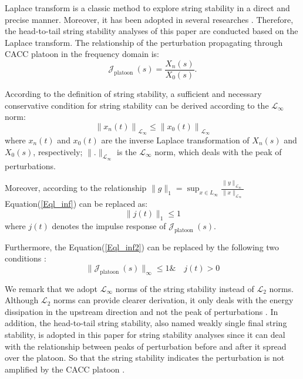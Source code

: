 \documentclass[journal]{IEEEtran}
\begin{document}
Laplace transform is a classic method to explore string stability in a direct and precise manner. Moreover, it has been adopted in several researches \citep{orosz2011delayed,montanino2021string,feng2019string}. Therefore, the head-to-tail string stability analyses of this paper are conducted based on the Laplace transform. The relationship of the perturbation propagating through CACC platoon in the frequency domain is:
\begin{equation}
  \mathcal{J}_{\text {platoon }}(s)=\frac{X_{n}(s)}{X_{0}(s)}.
\end{equation}

According to the definition of string stability, a sufficient and necessary conservative condition for string stability can be derived according to the $\mathcal{L}_{\infty}$ norm:
\begin{equation}
  \left\|x_{n}(t)\right\|_{\mathcal{L}_{\infty}} \leq \left\|x_{0}(t)\right\|_{\mathcal{L}_{\infty}}
  \label{Eql_inf}
\end{equation}
where $x_{n}(t)$ and $x_{0}(t)$ are the inverse Laplace transformation of $X_{n}(s)$ and $X_{0}(s)$, respectively; $\|.\|_{\mathcal{L}_{\infty}}$ is the $\mathcal{L}_{\infty}$ norm, which deals with the peak of perturbations.

Moreover, according to the relationship $\|g\|_{1}=\sup _{x \in L_{\infty}} \frac{\|y\|_{\mathcal{L}_{\infty}}}{\|x\|_{\mathcal{L}_{\infty}}}$ Equation(\ref{Eql_inf}) can be replaced as:
\begin{equation}
  \|j\left(t\right)\|_{1}\leq 1
  \label{Eql_inf2}
\end{equation}
where $j\left(t\right)$ denotes the impulse response of $\mathcal{J}_{\text {platoon }}(s)$.

Furthermore, the Equation(\ref{Eql_inf2}) can be replaced by the following two conditions \citep{Swaroop1994}:
\begin{equation}
  \|\mathcal{J}_{\text {platoon }}(s)\|_{\infty} \leq 1 \& \quad j\left(t\right)>0
  \label{Eql_inf3}
\end{equation}

We remark that we adopt $\mathcal{L}_{\infty}$ norms of the string stability instead of $\mathcal{L}_{2}$ norms. Although $\mathcal{L}_{2}$ norms can provide clearer derivation, it only deals with the energy dissipation in the upstream direction and not the peak of perturbations \citep{Darbha2003}. In addition, the head-to-tail string stability, also named weakly single final string stability, is adopted in this paper for string stability analyses since it can deal with the relationship between peaks of perturbation before and after it spread over the platoon. So that the string stability indicates the perturbation is not amplified by the CACC platoon \citep{Studli2017}.
\end{document}

